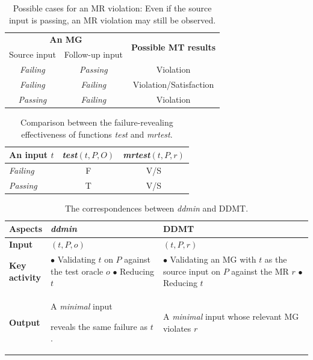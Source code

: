 \begin{table}[!t]
\caption{Possible cases for an MR violation: Even if the source input is passing, an MR violation may still be observed.}
\centering
\begin{tabular}{ccc}
\toprule
\multicolumn{2}{c}{\textbf{An MG}} & \multirow{2}{*}{\textbf{Possible MT results}}\\ \cline{1-2}
Source input & Follow-up input &  \\
\midrule
\emph{Failing} & \emph{Passing} & Violation \\
\emph{Failing} & \emph{Failing} & Violation/Satisfaction \\
\emph{Passing} & \emph{Failing} & Violation \\
\bottomrule
\end{tabular}
\label{tab:violation}
\end{table}

\begin{table}[!t]
\caption{Comparison between the failure-revealing effectiveness of functions \emph{test} and \emph{mrtest}.}
\centering
\begin{tabular}{lcc}
\toprule
\textbf{An input $t$} & \textbf{\emph{test}$(t, P, O)$} & \textbf{\emph{mrtest}$(t, P, r)$} \\
\midrule
\emph{Failing} & F & V/S \\
\emph{Passing} & T & V/S \\
\bottomrule
\end{tabular}
\label{tab:comp}
\end{table}


\begin{table}[!t]
\caption{The correspondences between \emph{ddmin} and DDMT.}
\centering
\small
\setlength{\tabcolsep}{4pt}  %
\begin{tabular}{@{} p{2.0cm} p{3cm} p{3cm} @{}}  %
\toprule
\textbf{Aspects} & \textbf{\emph{ddmin}} & \textbf{DDMT} \\
\midrule
\textbf{Input} & $(t, P, o)$ & $(t, P, r)$ \\
\midrule
\textbf{Key \newline activity} &
\parbox[t]{3cm}{\raggedright $\bullet$ Validating $t$ on $P$ against the test oracle $o$ \\ $\bullet$ Reducing $t$}&
\parbox[t]{3cm}{\raggedright $\bullet$ Validating an MG with $t$ as the source input on $P$ against the MR $r$ \\
$\bullet$ Reducing $t$} \\
\midrule
\textbf{Output} &
\parbox[t]{3cm}{\raggedright A \emph{minimal} input} reveals the same failure as $t$.&
\parbox[t]{3cm}{\raggedright A \emph{minimal} input whose relevant MG violates $r$}\\
\bottomrule
\end{tabular}
\label{tab:corr}
\end{table}



